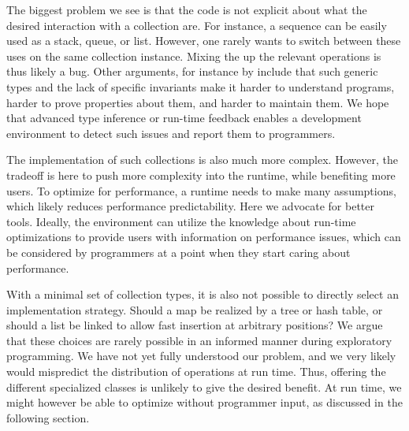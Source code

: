 \documentclass[sigconf, 10pt]{acmart}
\begin{document}
The biggest problem we see is
that the code is not explicit about
what the desired interaction with a collection are.
For instance, a sequence can be easily used as a stack, queue, or list.
However, one rarely wants to switch between these uses
on the same collection instance.
Mixing the up the relevant operations is thus likely a bug.
Other arguments, for instance by \citet{PeytonJones:1996:BTC}
include that such generic types and the lack of specific invariants
make it harder to understand programs, harder to prove properties about them,
and harder to maintain them.
We hope that advanced type inference or run-time feedback
enables a development environment to detect such issues
and report them to programmers.

The implementation of such collections is also much more complex.
However, the tradeoff is here to push more complexity into the runtime,
while benefiting more users.
To optimize for performance, a runtime needs to make many assumptions,
which likely reduces performance predictability.
Here we advocate for better tools.
Ideally, the environment can utilize the knowledge about run-time optimizations
to provide users with information on performance issues,
which can be considered by programmers
at a point when they start caring about performance.


With a minimal set of collection types,
it is also not possible to directly select an implementation strategy.
Should a map be realized by a tree or hash table,
or should a list be linked to allow fast insertion at arbitrary positions?
We argue that these choices are rarely possible in an informed manner during
exploratory programming.
We have not yet fully understood our problem,
and we very likely would mispredict the distribution of operations at run time.
Thus, offering the different specialized classes is unlikely to give the desired benefit.
At run time, we might however be able to optimize without programmer input,
as discussed in the following section.
\end{document}
